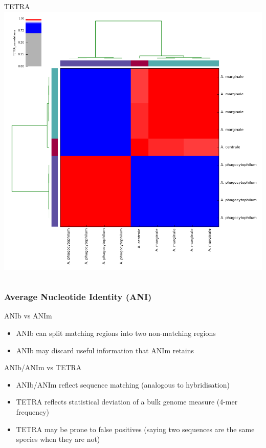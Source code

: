 \begin{frame}
\begin{columns}
      TETRA \\
      \includegraphics[width=\textwidth]{images/TETRA_correlations}    
  \end{columns} 
\end{frame}


%
\begin{frame}
  \frametitle{Average Nucleotide Identity (ANI)}
  \textcolor{hutton_green}{ANIb vs ANIm}
  \begin{itemize}
    \item ANIb can split matching regions into two non-matching regions
    \item ANIb may discard useful information that ANIm retains
  \end{itemize}
  \textcolor{hutton_blue}{ANIb/ANIm vs TETRA}
  \begin{itemize}
    \item ANIb/ANIm reflect sequence matching (analogous to hybridisation)
    \item TETRA reflects statistical deviation of a bulk genome measure (4-mer frequency)
    \item TETRA may be prone to false positives (saying two sequences are the same species when they are not)
  \end{itemize}  
\end{frame}

